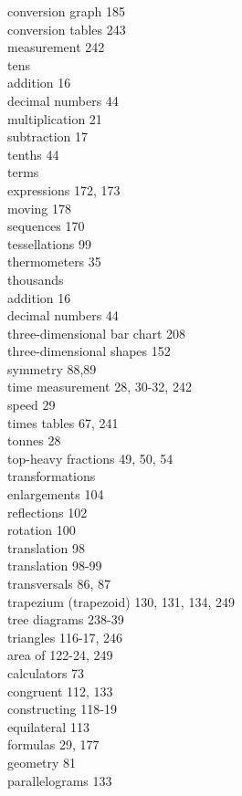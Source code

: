 \documentclass[10pt]{article}
\begin{document}
conversion graph 185\\
conversion tables 243\\
measurement 242\\
tens\\
addition 16\\
decimal numbers 44\\
multiplication 21\\
subtraction 17\\
tenths 44\\
terms\\
expressions 172, 173\\
moving 178\\
sequences 170\\
tessellations 99\\
thermometers 35\\
thousands\\
addition 16\\
decimal numbers 44\\
three-dimensional bar chart 208\\
three-dimensional shapes 152\\
symmetry 88,89\\
time measurement 28, 30-32, 242\\
speed 29\\
times tables 67, 241\\
tonnes 28\\
top-heavy fractions 49, 50, 54\\
transformations\\
enlargements 104\\
reflections 102\\
rotation 100\\
translation 98\\
translation 98-99\\
transversals 86, 87\\
trapezium (trapezoid) 130, 131, 134, 249\\
tree diagrams 238-39\\
triangles 116-17, 246\\
area of 122-24, 249\\
calculators 73\\
congruent 112, 133\\
constructing 118-19\\
equilateral 113\\
formulas 29, 177\\
geometry 81\\
parallelograms 133\\
\end{document}
